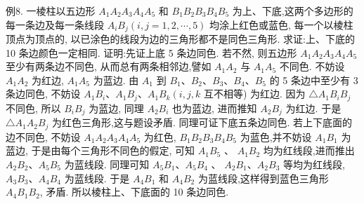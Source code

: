 例8. 一棱柱以五边形 $A_1 A_2 A_3 A_4 A_5$ 和 $B_1 B_2 B_3 B_4 B_5$ 为上、下底,这两个多边形的每一条边及每一条线段 $A_i B_j(i, j=1,2, \cdots, 5)$ 均涂上红色或蓝色, 每一个以棱柱顶点为顶点的, 以已涂色的线段为边的三角形都不是同色三角形.
求证:上、下底的 10 条边颜色一定相同.
证明:先证上底 5 条边同色.
若不然, 则五边形 $A_1 A_2 A_3 A_4 A_5$ 至少有两条边不同色, 从而总有两条相邻边,譬如 $A_1 A_2$ 与 $A_1 A_5$ 不同色.
不妨设 $A_1 A_2$ 为红边, $A_1 A_5$ 为蓝边.
由 $A_1$ 到 $B_1 、 B_2 、 B_3 、 B_4 、 B_5$ 的 5 条边中至少有 3 条边同色, 不妨设 $A_1 B_i 、 A_1 B_j 、 A_1 B_k\left(i, j, k\right.$ 互不相等) 为红边.
因为 $\triangle A_1 B_i B_j$ 不同色, 所以 $B_i B_j$ 为蓝边, 同理 $A_2 B_i$ 也为蓝边, 进而推知 $A_2 B_j$ 为红边.
于是 $\triangle A_1 A_2 B_j$ 为红色三角形,这与题设矛盾.
同理可证下底五条边同色.
若上下底面的边不同色, 不妨设 $A_1 A_2 A_3 A_4 A_5$ 为红色, $B_1 B_2 B_3 B_4 B_5$ 为蓝色,并不妨设 $A_1 B_1$ 为蓝边, 于是由每个三角形不同色的假定, 可知 $A_1 B_5$ 、 $A_1 B_2$ 均为红线段,进而推出 $A_2 B_2 、 A_5 B_5$ 为蓝线段.
同理可知 $A_5 B_1 、 A_5 B_4$ 、 $A_2 B_1 、 A_2 B_3$ 等均为红线段, $A_3 B_3 、 A_4 B_4$ 为蓝线段.
于是 $A_4 B_1$ 和 $A_4 B_2$ 为蓝线段,这样得到蓝色三角形 $A_4 B_1 B_2$, 矛盾.
所以棱柱上、下底面的 10 条边同色.



